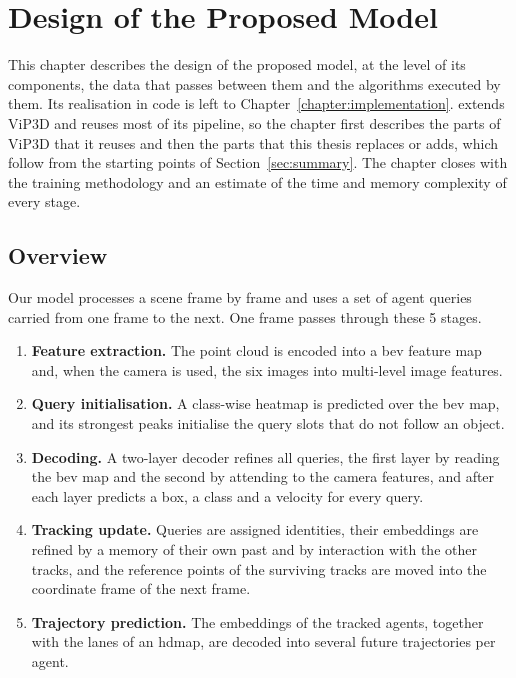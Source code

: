 \chapter{Design of the Proposed Model}
\label{chapter:design}

This chapter describes the design of the proposed model, at the
level of its components, the data that passes between them and the algorithms executed by them. Its
realisation in code is left to Chapter~\ref{chapter:implementation}. \modelname extends
ViP3D \cite{Gu2023ViP3D} and reuses most of its pipeline, so the chapter first describes the parts of ViP3D
that it reuses and then the parts that this thesis replaces or adds, which follow from the starting points of
Section~\ref{sec:summary}. The chapter closes with the training methodology and an estimate of the time and memory
complexity of every stage.


\section{Overview}
\label{sec:design-overview}

Our model processes a scene frame by frame and uses a set of agent queries carried from one frame to the next.
One frame passes through these 5 stages.

\begin{enumerate}
    \item \textbf{Feature extraction.} The point cloud is encoded into a \ac{bev} feature map and, when the
    camera is used, the six images into multi-level image features.
    \item \textbf{Query initialisation.} A class-wise heatmap is predicted over the \ac{bev} map, and its
    strongest peaks initialise the query slots that do not follow an object.
    \item \textbf{Decoding.} A two-layer decoder refines all queries, the first layer by reading the
    \ac{bev} map and the second by attending to the camera features, and after each layer predicts a box,
    a class and a velocity for every query.
    \item \textbf{Tracking update.} Queries are assigned identities, their embeddings are refined by a
    memory of their own past and by interaction with the other tracks, and the reference points of the
    surviving tracks are moved into the coordinate frame of the next frame.
    \item \textbf{Trajectory prediction.} The embeddings of the tracked agents, together with the lanes of
    an \ac{hdmap}, are decoded into several future trajectories per agent.
\end{enumerate}

